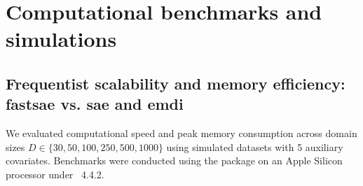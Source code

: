 \documentclass[article]{jss}
\begin{document}

\section{Computational benchmarks and simulations} \label{sec:simulations}

\subsection{Frequentist scalability and memory efficiency: fastsae vs. sae and emdi}

We evaluated computational speed and peak memory consumption across domain sizes $D \in \{30, 50, 100, 250, 500, 1000\}$ using simulated datasets with 5 auxiliary covariates. Benchmarks were conducted using the  package on an Apple Silicon processor under ~4.4.2.
\end{document}
